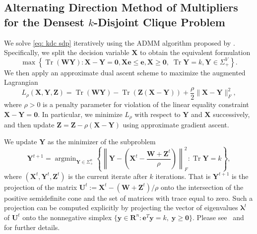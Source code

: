 \documentclass[twoside,11pt]{article}
\newcommand{\R}{\mathbf{R}}
\newcommand{\Z}{\bs{Z}}
\DeclareMathOperator*{\argmin}{\arg\min}
\DeclareMathOperator{\tr}{{Tr}}
\newcommand{\e}{\bs {e}}
\newcommand{\bs}{\boldsymbol}
\newcommand{\X}{\bs {X}}
\newcommand{\y}{\bs {y}}
\newcommand{\Y}{\bs {Y}}
\newcommand{\W}{\bs {W}}
\newcommand{\0}{\bs{0}}
\newcommand{\rbra}[1]{\ensuremath{\left( #1 \right)}} %
\newcommand{\bra}[1]{\ensuremath{\left\{ #1 \right\}}} %
\newcommand{\eq}[1]{\(#1\)}
\begin{document}
{\subsection{Alternating Direction Method of Multipliers for the Densest $k$-Disjoint Clique Problem}
We solve \eqref{eq: kdc sdp} iteratively using the ADMM algorithm proposed by \cite{ames2014guaranteed}.
Specifically, we split the decision variable \eq{\X} to obtain the equivalent formulation
\begin{equation} \label{eq: kdc admm}
\max \bra{ \tr(\W\Y) : \X - \Y = \0, \X\e \le \e, \X \ge \0, \; \tr \Y = k, \Y \in \Sigma^V_+ }.
\end{equation}
We then apply an approximate dual ascent scheme to maximize the augmented Lagrangian
\[
L_\rho(\X,\Y,\Z) = \tr(\W\Y) - \tr(\Z(\X-\Y) ) + \frac{\rho}{2} \| \X - \Y\|^2_F,
\]
where \(\rho > 0\) is a penalty parameter for violation of the linear equality constraint  \(\X-\Y = \0\).
In particular, we minimize \(L_\rho\) with respect to \(\Y\) and \(\X\) successively, and then update
\(\Z = \Z - \rho(\X-\Y)\) using approximate gradient ascent.

We update $\Y$ as the minimizer of the subproblem
\begin{equation}\label{eq: Y subprob}
	\Y^{t+1} = \argmin_{\Y \in \Sigma^n_+} \bra{  \left\| \Y - \rbra{ \X^t - \frac{\W + \Z^t}{\rho}}\right\|^2_F : \tr \Y = k},
\end{equation}
where $(\X^t, \Y^t, \Z^t)$ is the current iterate after $k$ iterations.
That is $\Y^{t+1}$ is the projection of the matrix $\bs{U}^t := \X^t - (\W + \Z^t)/\rho$ onto the intersection of the positive semidefinite cone and the set of matrices with trace equal to zero.
Such a projection can be computed explicitly by projecting the vector of eigenvalues $\bs{\lambda}^t$ of $\bs{U}^t$ onto the nonnegative simplex $\{\y \in \R^n: \e^T \y = k, \; \y \ge \bs 0\}$.
Please see~\citet[Proposition~2.6] {zhang2011penalty} and \citet{van2008probing} for further details.

}
\end{document}
